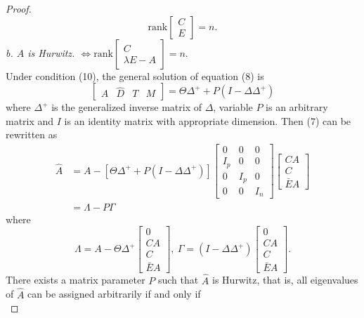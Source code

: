 \documentclass[english]{cccconf}
\theoremstyle{definition}
\begin{document}
\begin{proof}
\begin{equation}
\textrm{rank}\begin{bmatrix}
C\\E
\end{bmatrix}=n.
\end{equation}
\textit{b. $\hat{A}$ is Hurwitz. $\Leftrightarrow \textrm{rank}\begin{bmatrix}
C\\ \lambda E-A
\end{bmatrix}=n.$}\\
Under condition (10), the general solution of
equation (8) is
\begin{equation}
\begin{bmatrix}
\hat{A}&\hat{D}&T&M
\end{bmatrix}=\Theta\Delta^++P(I-\Delta\Delta^+)
\end{equation}
where $\Delta^+$ is the generalized inverse matrix of $\Delta$, variable $P$ is an arbitrary matrix and $I$ is an identity matrix with appropriate dimension. Then (7) can be rewritten as
\begin{equation}\begin{split}
\hat{A}&=A-[\Theta\Delta^++P(I-\Delta\Delta^+)]\begin{bmatrix}
0&0&0\\I_p&0&0\\0&I_p&0\\0&0&I_n
\end{bmatrix}\begin{bmatrix}
CA\\C\\ \bar{E}A
\end{bmatrix}\\ 
&=\Lambda-P\Gamma 
\end{split}\end{equation}
where 
\[\Lambda=A-\Theta\Delta^+\begin{bmatrix}
0\\CA\\C\\ \bar{E}A
\end{bmatrix},\ \Gamma=(I-\Delta\Delta^+)\begin{bmatrix}
0\\CA\\C\\ \bar{E}A
\end{bmatrix}.\]
There exists a matrix parameter $P$ such that $\hat{A}$ is Hurwitz, that is, all eigenvalues of $\hat{A}$ can be assigned arbitrarily if and only if
\begin{equation}

\end{equation}
\end{proof}
\end{document}

